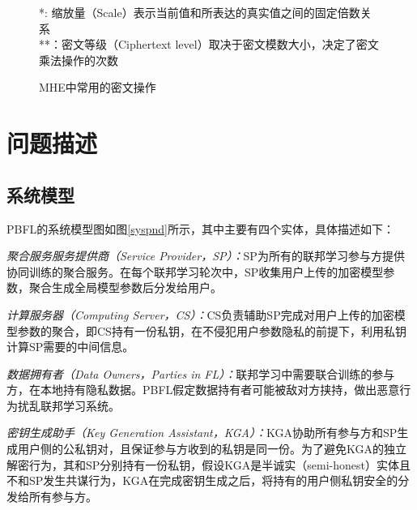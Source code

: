 \begin{figure}[htb]
		\footnotesize
		*: 缩放量（Scale）表示当前值和所表达的真实值之间的固定倍数关系\\
		**：密文等级（Ciphertext level）取决于密文模数大小，决定了密文乘法操作的次数
	\caption{MHE中常用的密文操作}
	\label{f1}
\end{figure}

\section{问题描述}\label{ps}

\subsection{系统模型}
PBFL的系统模型图如图\ref{syspnd}所示，其中主要有四个实体，具体描述如下：
\begin{compactitem}
	\item \textit{聚合服务服务提供商（Service Provider，SP）：}SP为所有的联邦学习参与方提供协同训练的聚合服务。在每个联邦学习轮次中，SP收集用户上传的加密模型参数，聚合生成全局模型参数后分发给用户。
	\item \textit{计算服务器（Computing Server，CS）：}CS负责辅助SP完成对用户上传的加密模型参数的聚合，即CS持有一份私钥，在不侵犯用户参数隐私的前提下，利用私钥计算SP需要的中间信息。
	\item \textit{数据拥有者（Data Owners，Parties in FL）：}联邦学习中需要联合训练的参与方，在本地持有隐私数据。PBFL假定数据持有者可能被敌对方挟持，做出恶意行为扰乱联邦学习系统。
	\item \textit{密钥生成助手（Key Generation Assistant，KGA）：}KGA协助所有参与方和SP生成用户侧的公私钥对，且保证参与方收到的私钥是同一份。为了避免KGA的独立解密行为，其和SP分别持有一份私钥，假设KGA是半诚实（semi-honest）实体且不和SP发生共谋行为，KGA在完成密钥生成之后，将持有的用户侧私钥安全的分发给所有参与方。
\end{compactitem}

